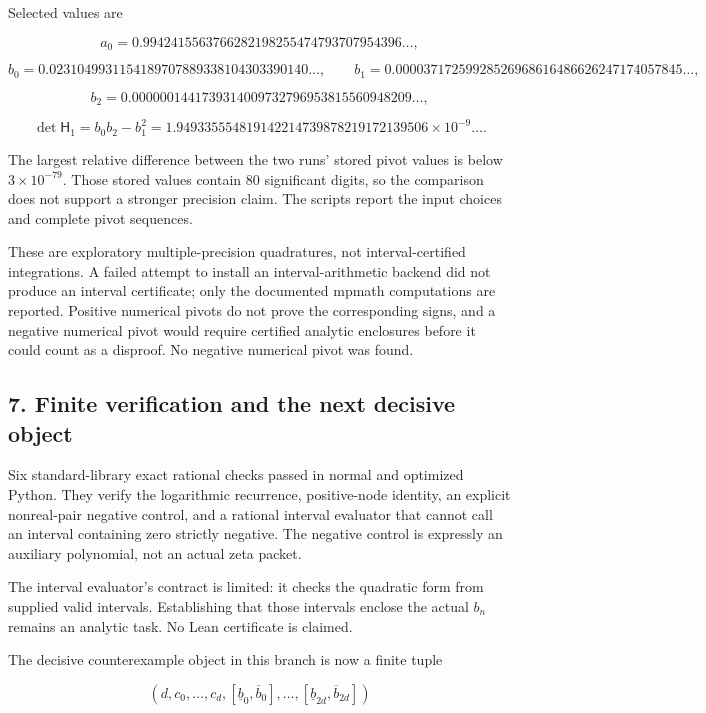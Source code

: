 Selected values are

\[
a_0=0.9942415563766282198255474793707954396\ldots,
\]

\[
b_0=0.0231049931154189707889338104303390140\ldots,
\qquad
b_1=0.00003717259928526968616486626247174057845\ldots,
\]

\[
b_2=0.0000001441739314009732796953815560948209\ldots,
\]

\[
\det\mathsf H_1
=b_0b_2-b_1^2
=1.949335554819142214739878219172139506\times10^{-9}\ldots.
\]

The largest relative difference between the two runs' stored pivot
values is below \(3\times10^{-79}\). Those stored values contain 80
significant digits, so the comparison does not support a stronger
precision claim. The scripts report the input choices and complete pivot
sequences.

These are exploratory multiple-precision quadratures, not
interval-certified integrations. A failed attempt to install an
interval-arithmetic backend did not produce an interval certificate;
only the documented mpmath computations are reported. Positive numerical
pivots do not prove the corresponding signs, and a negative numerical
pivot would require certified analytic enclosures before it could count
as a disproof. No negative numerical pivot was found.

\subsection{7. Finite verification and the next decisive
object}\label{finite-verification-and-the-next-decisive-object}

Six standard-library exact rational checks passed in normal and
optimized Python. They verify the logarithmic recurrence, positive-node
identity, an explicit nonreal-pair negative control, and a rational
interval evaluator that cannot call an interval containing zero strictly
negative. The negative control is expressly an auxiliary polynomial, not
an actual zeta packet.

The interval evaluator's contract is limited: it checks the quadratic
form from supplied valid intervals. Establishing that those intervals
enclose the actual \(b_n\) remains an analytic task. No Lean certificate
is claimed.

The decisive counterexample object in this branch is now a finite tuple

\[
(d,c_0,\ldots,c_d,
[\underline b_0,\overline b_0],\ldots,
[\underline b_{2d},\overline b_{2d}])
\]

